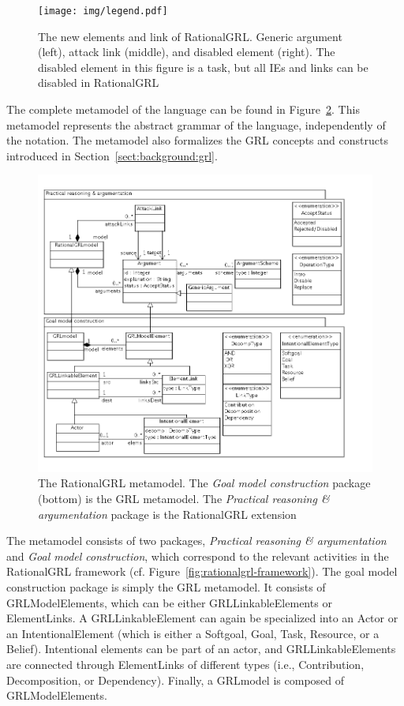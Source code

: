 \begin{figure}[b]
\centering
\texttt{[image: img/legend.pdf]}
\caption{The new elements and link of RationalGRL. Generic argument (left), attack link (middle), and disabled element (right). The disabled element in this figure is a task, but all IEs and links can be disabled in RationalGRL}
\label{fig:rationalgrllegend}
\end{figure}


The complete metamodel of the language can be found in Figure~\ref{fig:metamodel}. This metamodel represents the abstract grammar of the language, independently of the notation. The metamodel also formalizes the GRL concepts and constructs introduced in Section~\ref{sect:background:grl}.

\begin{figure}[t]
\includegraphics[width=\textwidth]{metamodel/metamodel2}
\caption{The RationalGRL metamodel. The \emph{Goal model construction} package (bottom) is the GRL metamodel. The \emph{Practical reasoning \& argumentation} package is the RationalGRL extension}
\label{fig:metamodel}
\end{figure}

The metamodel consists of two packages, \emph{Practical reasoning \& argumentation} and \emph{Goal model construction}, which correspond to the relevant activities in the RationalGRL framework (cf. Figure~\ref{fig:rationalgrl-framework}). The goal model construction package is simply the GRL metamodel. It consists of \textsf{GRLModelElements}, which can be either \textsf{GRLLinkableElements} or \textsf{ElementLinks}. A \textsf{GRLLinkableElement} can again be specialized into an \textsf{Actor} or an \textsf{IntentionalElement} (which is either a \textsf{Softgoal}, \textsf{Goal}, \textsf{Task}, \textsf{Resource}, or a \textsf{Belief}). Intentional elements can be part of an actor, and \textsf{GRLLinkableElements} are connected through \textsf{ElementLinks} of different types (i.e., \textsf{Contribution, Decomposition}, or \textsf{Dependency}). Finally, a \textsf{GRLmodel} is composed of \textsf{GRLModelElements}.

